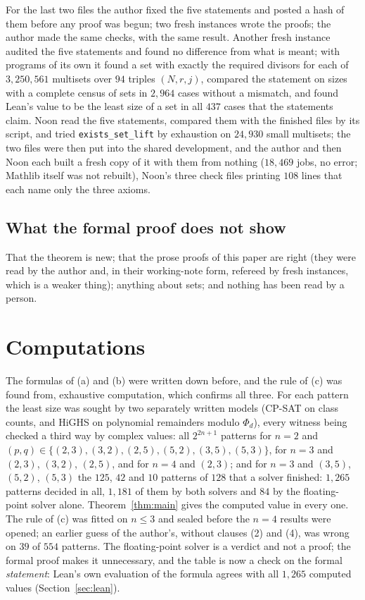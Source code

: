 \documentclass[11pt,a4paper]{amsart}
\theoremstyle{definition}
\theoremstyle{remark}
\newcommand{\lean}[1]{\texttt{#1}}
\begin{document}
For the last two files the author fixed the five statements and posted a hash of them before any proof was begun; two fresh instances wrote the proofs; the author made the same checks, with the same result. Another fresh instance audited the five statements and found no difference from what is meant; with programs of its own it found a set with exactly the required divisors for each of $3{,}250{,}561$ multisets over $94$ triples $(N,r,j)$, compared the statement on sizes with a complete census of sets in $2{,}964$ cases without a mismatch, and found Lean's value to be the least size of a set in all $437$ cases that the statements claim. Noon read the five statements, compared them with the finished files by its script, and tried \lean{exists\_set\_lift} by exhaustion on $24{,}930$ small multisets; the two files were then put into the shared development, and the author and then Noon each built a fresh copy of it with them from nothing ($18{,}469$ jobs, no error; Mathlib itself was not rebuilt), Noon's three check files printing $108$ lines that each name only the three axioms.

\subsection*{What the formal proof does not show} That the theorem is new; that the prose proofs of this
paper are right (they were read by the author and, in their working-note form, refereed by fresh instances,
which is a weaker thing); anything about sets; and nothing has been read by a person.


\section{Computations}\label{sec:computations}

The formulas of (a) and (b) were written down before, and the rule of (c) was found from, exhaustive
computation, which confirms all three. For each pattern the least size was sought by two separately written models (CP-SAT on class counts,
and HiGHS on polynomial remainders modulo $\Phi_d$), every witness being checked a third way by complex
values: all $2^{2n+1}$ patterns for $n=2$ and $(p,q)\in\{(2,3),(3,2),(2,5),(5,2),(3,5),(5,3)\}$, for
$n=3$ and $(2,3)$, $(3,2)$, $(2,5)$, and for $n=4$ and $(2,3)$; and for $n=3$ and $(3,5)$, $(5,2)$,
$(5,3)$ the $125$, $42$ and $10$ patterns of $128$ that a solver finished: $1{,}265$ patterns decided
in all, $1{,}181$ of them by both solvers and $84$ by the floating-point solver alone. Theorem~\ref{thm:main} gives the computed value in every
one. The rule of (c) was fitted on $n\le3$ and sealed before the $n=4$ results were opened; an earlier guess
of the author's, without clauses (2) and (4), was wrong on $39$ of $554$ patterns. The floating-point solver
is a verdict and not a proof; the formal proof makes it unnecessary, and the table is now a check on the
formal \emph{statement}: Lean's own evaluation of the formula agrees with all $1{,}265$ computed values
(Section~\ref{sec:lean}).
\end{document}
